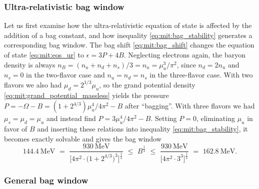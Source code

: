 \subsubsection{Ultra-relativistic bag window}

Let us first examine how the ultra-relativistic equation of state is affected by the addition of a bag constant,
and how inequality \eqref{eq:mit:bag_stability} generates a corresponding bag window.
The bag shift \eqref{eq:mit:bag_shift} changes the equation of state \eqref{eq:mit:eos_ur} to $\epsilon = 3 P + 4 B$.
Neglecting electrons again, the baryon density is always $n_B = (n_u+n_d+n_s)/3 = n_u = \mu_u^3 / \pi^2$,
since $n_d = 2 n_u$ and $n_s=0$ in the two-flavor case and $n_u=n_d=n_s$ in the three-flavor case.
With two flavors we also had $\mu_d = 2^{1/3} \mu_u$,
so the grand potential density \eqref{eq:mit:grand_potential_massless}
yields the pressure $P = -\Omega - B = (1 + 2^{4/3}) \mu_u^4 / 4 \pi^2 - B$ after ``bagging''.
With three flavors we had $\mu_s = \mu_d = \mu_u$ and instead find $P = 3 \mu_u^4 / 4 \pi^2 - B$.
Setting $P=0$, eliminating $\mu_u$ in favor of $B$ and inserting these relations into inequality \eqref{eq:mit:bag_stability},
it becomes exactly solvable and gives the bag window
\begin{equation}
	\SI{144.4}{\mega\electronvolt} \,\, = \,\,
	\frac{\SI{930}{\mega\electronvolt}}{\Big[4 \pi^2 \!\cdot\! \big(1+2^{4/3}\big)^3\Big]^\frac14}
	\,\, \leq \,\, B^\frac14 \,\, \leq \,\,
	\frac{\SI{930}{\mega\electronvolt}}{\Big[4 \pi^2 \!\cdot\! 3^3\Big]^\frac14}
	\,\, = \,\, \SI{162.8}{\mega\electronvolt}.
\label{eq:mit:bag_window_ur}
\end{equation}

\subsubsection{General bag window}

